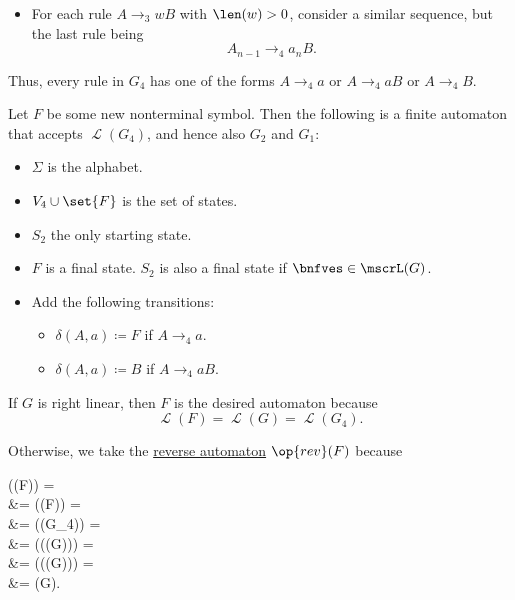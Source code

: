 \begin{algorithm}
\begin{thmenum}
\begin{itemize}
      \item For each rule \( A \to_3 wB \) with \( \len(w) > 0 \), consider a similar sequence, but the last rule being
      \begin{equation*}
        A_{n-1} \to_4 a_n B.
      \end{equation*}
    \end{itemize}

    Thus, every rule in \( G_4 \) has one of the forms \( A \to_4 a \) or \( A \to_4 a B \) or \( A \to_4 B \).

     Let \( F \) be some new nonterminal symbol. Then the following is a finite automaton that accepts \( \mscrL(G_4) \), and hence also \( G_2 \) and \( G_1 \):
    \begin{itemize}
      \item \( \Sigma \) is the alphabet.
      \item \( V_4 \cup \set{ F } \) is the set of states.
      \item \( S_2 \) the only starting state.
      \item \( F \) is a final state. \( S_2 \) is also a final state if \( \bnfves \in \mscrL(G) \).
      \item Add the following transitions:
      \begin{itemize}
        \item \( \delta(A, a) \coloneqq F \) if \( A \to_4 a \).
        \item \( \delta(A, a) \coloneqq B \) if \( A \to_4 aB \).
      \end{itemize}
    \end{itemize}

     If \( G \) is right linear, then \( F \) is the desired automaton because
    \begin{equation*}
      \mscrL(F) = \mscrL(G) = \mscrL(G_4).
    \end{equation*}

    Otherwise, we take the \hyperref[def:reverse_finite_automaton]{reverse automaton} \( \op{rev}(F) \) because
    \begin{balign*}
      \mscrL((F))
      \reloset {\ref{thm:reverse_finite_automaton_language}} = \\ &=
      (\mscrL(F))
      = \\ &=
      (\mscrL(G_4))
      = \\ &=
      (\mscrL((G)))
      \reloset {\ref{thm:reverse_grammar_language}} = \\ &=
      ((\mscrL(G)))
      \reloset {\ref{thm:reverse_language_involution}} = \\ &=
      \mscrL(G).
    \end{balign*}
  \end{thmenum}
\end{algorithm}
